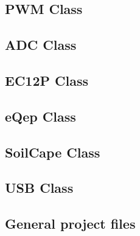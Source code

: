 \documentclass[11pt,fleqn,,a4paper,twoside,openright]{book}
\begin{document}
\subsection*{PWM Class}


\newpage
\subsection*{ADC Class}


\newpage
\subsection*{EC12P Class}


\newpage
\subsection*{eQep Class}


\newpage
\subsection*{SoilCape Class}


\newpage
\subsection*{USB Class}


\newpage
\subsection*{General project files}










\end{document}
